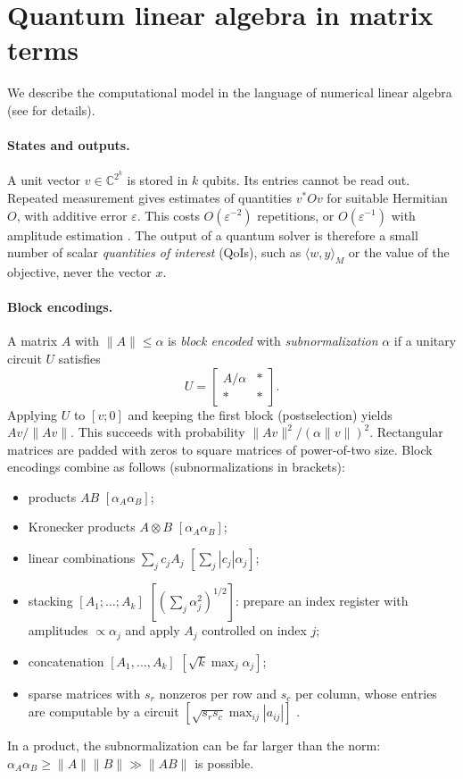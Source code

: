\documentclass[11pt,a4paper]{article}
\newcommand{\C}{\mathbb{C}}
\theoremstyle{remark}
\begin{document}
\section{Quantum linear algebra in matrix terms}\label{sec:prelim}

We describe the computational model in the language of numerical linear
algebra (see \cite{GSLW19,Lin22} for details).

\paragraph{States and outputs.} A unit vector $v\in\C^{2^k}$ is stored in $k$
qubits. Its entries cannot be read out. Repeated measurement gives
estimates of quantities $v^*Ov$ for suitable Hermitian $O$, with additive error
$\varepsilon$. This costs $O(\varepsilon^{-2})$ repetitions, or $O(\varepsilon^{-1})$ with amplitude
estimation \cite{BHMT02}. The output of a quantum solver is therefore a
small number of scalar \emph{quantities of interest} (QoIs), such as
$\langle w,y\rangle_M$ or the value of the objective, never the vector $x$.

\paragraph{Block encodings.} A matrix $A$ with $\|A\|\le\alpha$ is \emph{block encoded}
with \emph{subnormalization} $\alpha$ if a unitary circuit $U$ satisfies
\[
U=\begin{bmatrix}A/\alpha & *\\ * & *\end{bmatrix}.
\]
Applying $U$ to $[v;0]$ and keeping the first block (postselection) yields
$Av/\|Av\|$. This succeeds with probability $\|Av\|^2/(\alpha\|v\|)^2$.
Rectangular matrices are padded with zeros to square matrices of
power-of-two size. Block encodings combine as follows (subnormalizations in
brackets):
\begin{itemize}
\item products $AB$ $[\alpha_A\alpha_B]$;
\item Kronecker products $A\otimes B$ $[\alpha_A\alpha_B]$;
\item linear combinations $\sum_jc_jA_j$ $[\sum_j|c_j|\alpha_j]$;
\item stacking $[A_1;\dots;A_k]$ $[(\sum_j\alpha_j^2)^{1/2}]$: prepare an index
  register with amplitudes $\propto\alpha_j$ and apply $A_j$ controlled on
  index $j$;
\item concatenation $[A_1,\dots,A_k]$ $[\sqrt k\max_j\alpha_j]$;
\item sparse matrices with $s_r$ nonzeros per row and $s_c$ per column,
  whose entries are computable by a circuit $[\sqrt{s_rs_c}\max_{ij}|a_{ij}|]$
  \cite{GSLW19}.
\end{itemize}
In a product, the subnormalization can be far larger than the norm:
$\alpha_A\alpha_B\ge\|A\|\|B\|\gg\|AB\|$ is possible.
\end{document}
